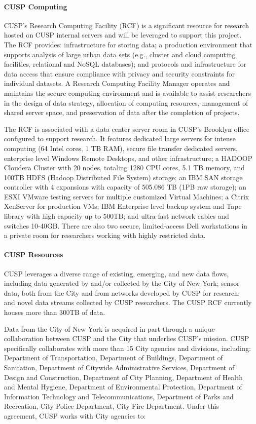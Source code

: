 \paragraph{CUSP Computing}
CUSP's Research Computing Facility (RCF) is a significant resource for research hosted on CUSP internal servers and will be leveraged to support this project.  The RCF provides: infrastructure for storing data; a production environment that supports analysis of large urban data sets (e.g., cluster and cloud computing facilities, relational and NoSQL databases); and protocols and infrastructure for data access that ensure compliance with privacy and security constraints for individual datasets. A Research Computing Facility Manager operates and maintains the secure computing environment and is available to assist researchers in the design of data strategy, allocation of computing resources, management of shared server space, and preservation of data after the completion of projects.

The RCF is associated with a data center server room in CUSP's Brooklyn office configured to support research. It features dedicated large servers for intense computing (64 Intel cores, 1 TB RAM), secure file transfer dedicated servers, enterprise level Windows Remote Desktops, and other infrastructure; a HADOOP Cloudera Cluster with 20 nodes, totaling 1280 CPU cores, 5.1 TB memory, and 100TB HDFS (Hadoop Distributed File System) storage; an IBM SAN storage controller with 4 expansions with capacity of 505.086 TB (1PB raw storage); an ESXI VMware testing servers for multiple customized Virtual Machines; a Citrix XenServer for production VMs; IBM Enterprise level backup system and Tape library with high capacity up to 500TB; and ultra-fast network cables and switches 10-40GB. There are also two secure, limited-access Dell workstations in a private room for researchers working with highly restricted data.

\paragraph{CUSP Resources}
CUSP leverages a diverse range of existing, emerging, and new data flows, including data generated by and/or collected by the City of New York; sensor data, both from the City and from networks developed by CUSP for research; and novel data streams collected by CUSP researchers. The CUSP RCF currently houses more than 300TB of data.

Data from the City of New York is acquired in part through a unique collaboration between CUSP and the City that underlies CUSP's mission.  CUSP specifically collaborates with more than 15 City agencies and divisions, including:  Department of Transportation, Department of Buildings, Department of Sanitation, Department of Citywide Administrative Services, Department of Design and Construction, Department of City Planning, Department of Health and Mental Hygiene, Department of Environmental Protection, Department of Information Technology and Telecommunications, Department of Parks and Recreation, City Police Department, City Fire Department.  Under this agreement, CUSP works with City agencies to:

